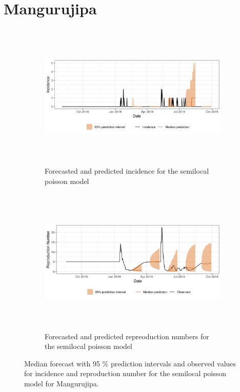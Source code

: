  \section{ Mangurujipa }\begin{figure}[H]\begin{subfigure}{\textwidth}  \centering  \includegraphics[width=0.9\linewidth, height=7cm]{../output/Mangurujipa_predictions.png}  \caption{Forecasted and predicted incidence for the semilocal poisson model}\end{subfigure}

\begin{subfigure}{\textwidth}  \centering  \includegraphics[width=0.9\linewidth, height=7cm]{../output/Mangurujipa_Rs.png}  \caption{Forecasted and predicted repreoduction numbers for the semilocal poisson model}\end{subfigure}  \caption{Median forecast with 95 \% prediction intervals and observed values for incidence and reproduction number for the semilocal poisson model for Mangurujipa.}\end{figure}

